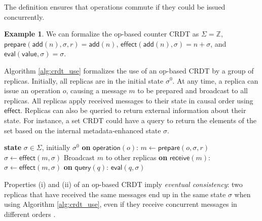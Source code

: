 \documentclass[acmsmall,nonacm,12pt]{acmart}
\newcommand{\mb}[1]{\ensuremath{\mathbb{#1}}}
\newcommand{\msf}[1]{\ensuremath{\mathsf{#1}}}
\newcommand{\Z}{\mb{Z}}
\theoremstyle{plain}
\theoremstyle{definition}
\newtheorem{myex}[mythm]{Example}
\begin{document}
The definition ensures that operations commute if they could be issued concurrently.

\begin{myex}
We can formalize the op-based counter CRDT as $\Sigma = \Z$, \\ $\msf{prepare}(\msf{add}(n), \sigma, r) = \msf{add}(n)$, $\msf{effect}(\msf{add}(n), \sigma) = n + \sigma$, and $\msf{eval}(\msf{value}, \sigma) = \sigma$.
\end{myex}


Algorithm \ref{alg:crdt_use} formalizes the use of an op-based CRDT by a group of replicas.  Initially, all replicas are in the initial state $\sigma^0$.  At any time, a replica can issue an operation $o$, causing a message $m$ to be prepared and broadcast to all replicas.  All replicas apply received messages to their state in causal order using $\msf{effect}$.  Replicas can also be queried to return external information about their state.  For instance, a set CRDT could have a query to return the elements of the set based on the internal metadata-enhanced state $\sigma$.

\begin{algorithm}[ht!]
\begin{algorithmic}[1]
\State \textbf{state} $\sigma \in \Sigma$, initially $\sigma^0$
\State \textbf{on} $\msf{operation}(o)$:
\Indent
  \State $m \gets \msf{prepare}(o, \sigma, r)$
  \State $\sigma \gets \msf{effect}(m, \sigma)$
  \State Broadcast $m$ to other replicas
\EndIndent
\State \textbf{on} $\msf{receive}(m)$:
\Indent
  \State $\sigma \gets \msf{effect}(m, \sigma)$
\EndIndent
  \State \textbf{on} $\msf{query}(q)$:
\Indent
  \State \Return $\msf{eval}(q, \sigma)$
\EndIndent
\end{algorithmic}
\caption{Distributed algorithm describing the use of an op-based CRDT by a replica $r$, based on \cite[Algorithm 1]{pure_op_based_crdts_extended} \cite{crdt_survey_2011}.  Messages are assumed to be received in causal order.%
}
\label{alg:crdt_use}
\end{algorithm}

Properties (i) and (ii) of an op-based CRDT imply \textit{eventual consistency}: two replicas that have received the same messages end up in the same state $\sigma$ when using Algorithm \ref{alg:crdt_use}, even if they receive concurrent messages in different orders \cite[Proposition 2.2]{crdt_survey_2011}.
\end{document}
